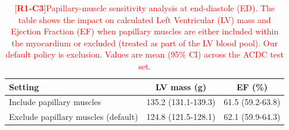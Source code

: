 \documentclass[fleqn,10pt]{wlscirep}
\newcommand{\revtag}[2]{[\textbf{R#1-C#2}]}
\newcommand{\Rone}[1]{\textcolor{red}{#1}}
\begin{document}
\begin{table}[ht]
  \caption{\Rone{\revtag{1}{3}Papillary-muscle sensitivity analysis at end-diastole (ED). The table shows the impact on calculated Left Ventricular (LV) mass and Ejection Fraction (EF) when papillary muscles are either included within the myocardium or excluded (treated as part of the LV blood pool). Our default policy is exclusion. Values are mean (95\% CI) across the ACDC test set.}}
  \label{tab:papillary_sensitivity}
  \centering
  \begin{tabular}{lcc}
    \toprule
    Setting & LV mass (g) & EF (\%) \\
    \midrule
    Include papillary muscles & 135.2 (131.1-139.3) & 61.5 (59.2-63.8) \\
    Exclude papillary muscles (default) & 124.8 (121.5-128.1) & 62.1 (59.9-64.3) \\
    \bottomrule
  \end{tabular}
\end{table}
\end{document}
